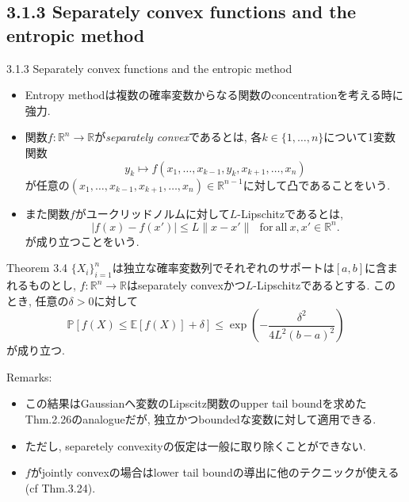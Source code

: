 \documentclass[aspectratio=169, dvipdfmx]{beamer}
\newcommand{\ex}{\mathbb{E}}
\begin{document}
\subsection{3.1.3 Separately convex functions and the entropic method}
\begin{frame}{3.1.3 Separately convex functions and the entropic method}
\begin{itemize}
    \item Entropy methodは複数の確率変数からなる関数のconcentrationを考える時に強力.
    \item 関数$f:\mathbb{R}^n \to \mathbb{R}$が{\it separately convex}であるとは,
          各$k\in\{1,\dots,n\}$について1変数関数
          \[y_k \mapsto f(x_1,\dots,x_{k-1},y_k,x_{k+1},\dots,x_n)\]
          が任意の$(x_1,\dots,x_{k-1},x_{k+1},\dots,x_n) \in \mathbb{R}^{n-1}$に対して凸であることをいう.
    \item また関数$f$がユークリッドノルムに対して$L$-Lipschitzであるとは,
          \[
              \left|f(x)-f(x')\right| \le L \|x-x'\|
              \ \ \ \mathrm{for\ all}\ x,x'\in\mathbb{R}^n.
          \]
          が成り立つことをいう.
\end{itemize}
\end{frame}

\begin{frame}
\begin{block}{Theorem 3.4}
    $\{X_i\}_{i=1}^n$は独立な確率変数列でそれぞれのサポートは$[a,b]$に含まれるものとし,
    $f:\mathbb{R}^n\to\mathbb{R}$はseparately convexかつ$L$-Lipschitzであるとする.
    このとき, 任意の$\delta > 0$に対して
    \[
        \mathbb{P}\left[ f(X) \le \ex[f(X)] + \delta \right]
        \le \exp\left(-\frac{\delta^2}{4L^2(b-a)^2}\right)
        \tag{3.16}\label{3.16}
    \]
    が成り立つ.
\end{block}
{Remarks:}
\begin{itemize}
    \item この結果はGaussianヘ変数のLipscitz関数のupper tail boundを求めたThm.2.26のanalogueだが,
          独立かつboundedな変数に対して適用できる.
    \item ただし, separetely convexityの仮定は一般に取り除くことができない.
    \item $f$がjointly convexの場合はlower tail boundの導出に他のテクニックが使える(cf Thm.3.24).
\end{itemize}
\end{frame}
\end{document}
